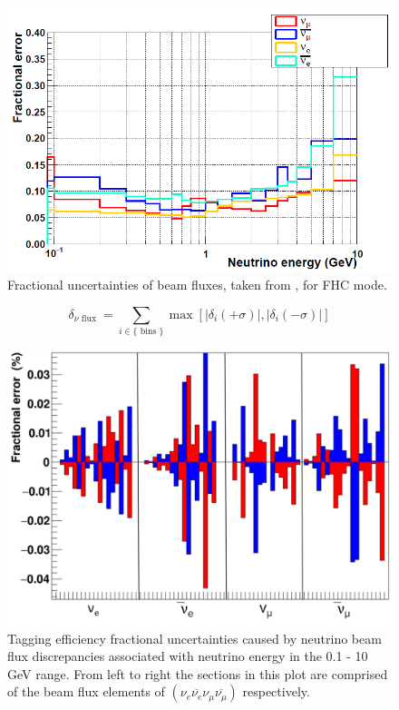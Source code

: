\begin{figure}[!htb]
    \includegraphics[width=\textwidth]{Figures/frac_beam_flux_uncertainty.png}
    \caption{Fractional uncertainties of beam fluxes, taken from \cite{tn415_fiacob}, for FHC mode. }
    \label{fig:frac_beam_flux_uncertainty}
\end{figure}


\begin{equation}
    \delta_{\nu \text { flux }}=\sum_{i \in\{\text { bins }\}} \max \left[\left|\delta_{i}(+\sigma)\right|,\left|\delta_{i}(-\sigma)\right|\right]
 \label{eq:summingfluxuncertainty}   
\end{equation}

\begin{figure}[!htb]
    \centering
\includegraphics[width=\textwidth]{Figures/flux_uncertainty.png}
\caption{Tagging efficiency fractional uncertainties caused by neutrino beam flux discrepancies associated with neutrino energy in the 0.1 - 10 GeV range. From left to right the sections in this plot are comprised of the beam flux elements of $\left(\nu_{e} \overline{\nu_{e}} \nu_{\mu} \overline{\nu_{\mu}}\right)$ respectively.}
\label{fig:fluxuncertainty}
\end{figure}

